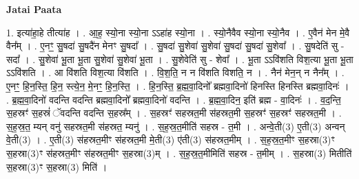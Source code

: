 \documentclass[17pt]{extarticle}
\begin{document}
\textbf{Jatai Paata} \newline

1. इत्या॑हा॒हे तीत्या॑ह । . आ॒ह॒ स्यो॒ना स्यो॒ना ऽऽहा॑ह स्यो॒ना । . स्यो॒नैवैव स्यो॒ना स्यो॒नैव । . ए॒वैन॑ मेन मे॒वै वैन᳚म् । . ए॒नꣳ॒॒ सु॒षदा॑ सु॒षदै॑न मेनꣳ सु॒षदा᳚ । . सु॒षदा॑ सु॒शेवा॑ सु॒शेवा॑ सु॒षदा॑ सु॒षदा॑ सु॒शेवा᳚ । . सु॒षदेति॑ सु - सदा᳚ । . सु॒शेवा॑ भू॒ता भू॒ता सु॒शेवा॑ सु॒शेवा॑ भू॒ता । . सु॒शेवेति॑ सु - शेवा᳚ । . भू॒ता ऽऽवि॑शति विश॒त्या भू॒ता भू॒ता ऽऽवि॑शति । . आ वि॑शति विश॒त्या वि॑शति । . वि॒श॒ति॒ न न वि॑शति विशति॒ न । . नैन॑ मेन॒न् न नैन᳚म् । . ए॒नꣳ॒॒ हि॒न॒स्ति॒ हि॒न॒ स्त्ये॒न॒ मे॒नꣳ॒॒ हि॒न॒स्ति॒ । . हि॒न॒स्ति॒ ब्र॒ह्म॒वा॒दिनो᳚ ब्रह्मवा॒दिनो॑ हिनस्ति हिनस्ति ब्रह्मवा॒दिनः॑ । . ब्र॒ह्म॒वा॒दिनो॑ वदन्ति वदन्ति ब्रह्मवा॒दिनो᳚ ब्रह्मवा॒दिनो॑ वदन्ति । . ब्र॒ह्म॒वा॒दिन॒ इति॑ ब्रह्म - वा॒दिनः॑ । . व॒द॒न्ति॒ स॒हस्रꣳ॑ स॒हस्रं॑ ॅवदन्ति वदन्ति स॒हस्र᳚म् । . स॒हस्रꣳ॑ सहस्रत॒मी स॑हस्रत॒मी स॒हस्रꣳ॑ स॒हस्रꣳ॑ सहस्रत॒मी । . स॒ह॒स्र॒त॒ म्यन् वनु॑ सहस्रत॒मी स॑हस्रत॒ म्यनु॑ । . स॒ह॒स्र॒त॒मीति॑ सहस्र - त॒मी । . अन्वे॒ती(3) ए॒ती(3) अन्वन् वे॒ती(3) । . ए॒ती(3) स॑हस्रत॒मीꣳ स॑हस्रत॒मी मे॒ती(3) ए॑ती(3) स॑हस्रत॒मीम् । . स॒ह॒स्र॒त॒मीꣳ स॒हस्रा(3)ꣳ स॒हस्रा(3)ꣳ स॑हस्रत॒मीꣳ स॑हस्रत॒मीꣳ स॒हस्रा(3)म् । . स॒ह॒स्र॒त॒मीमिति॑ सहस्र - त॒मीम् । . स॒हस्रा(3) मितीति॑ स॒हस्रा(3)ꣳ स॒हस्रा(3) मिति॑ । \newline
\end{document}
